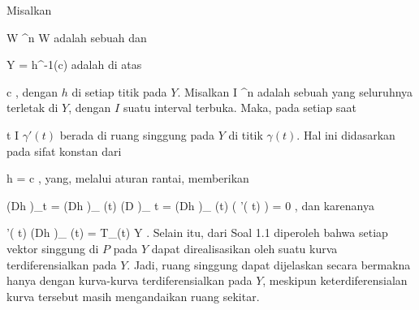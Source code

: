 {}
{

Misalkan

\mavergleichskette
{\vergleichskette
{ W
}
{ \subseteq }{ \R^n
}
{  }{
}
{    }{
}
{   }{
}
}
{}{}{}
 { W } { \R
} {}
adalah sebuah
dan

\mavergleichskette
{\vergleichskette
{ Y
}
{ = }{ h^{-1}(c)
}
{  }{
}
{    }{
}
{   }{
}
}
{}{}{}
adalah
di atas

\mavergleichskette
{\vergleichskette
{ c
}
{ \in }{ \R
}
{  }{
}
{    }{
}
{   }{
}
}
{}{}{,}
dengan $h$
di setiap titik pada $Y$. Misalkan
\maabbdisp {\gamma} { I } { \R^n
} {}
adalah sebuah
yang seluruhnya terletak di $Y$, dengan $I$ suatu interval terbuka. Maka, pada setiap saat

\mavergleichskette
{\vergleichskette
{ t
}
{ \in }{ I
}
{  }{
}
{    }{
}
{   }{
}
}
{}{}{}
$\gamma'(t)$ berada di ruang singgung pada $Y$ di titik $\gamma(t)$. Hal ini didasarkan pada sifat konstan dari

\mavergleichskette
{\vergleichskette
{ h \circ \gamma
}
{ = }{ c
}
{  }{
}
{    }{
}
{   }{
}
}
{}{}{,}
yang, melalui aturan rantai, memberikan

\mavergleichskettedisp
{\vergleichskette
{ \left(Dh \circ \gamma\right)_{t}
}
{ =} { \left(Dh  \right)_{ \gamma(t) }  \circ \left(D \gamma  \right)_{ t }
}
{ =} { \left(Dh  \right)_{ \gamma(t) } ( \gamma'( t) )
}
{ =} { 0
}
{ } {
}
}
{}{}{,}
dan karenanya

\mavergleichskette
{\vergleichskette
{ \gamma'( t)
}
{ \in }{ \ker  \left(Dh \right)_{ \gamma(t) }
}
{ = }{ T_{\gamma(t) }Y
}
{    }{
}
{   }{
}
}
{}{}{.}
Selain itu, dari
Soal 1.1
diperoleh bahwa setiap vektor singgung di $P$ pada $Y$ dapat direalisasikan oleh suatu kurva terdiferensialkan pada $Y$. Jadi, ruang singgung dapat dijelaskan secara bermakna hanya dengan kurva-kurva terdiferensialkan pada $Y$, meskipun keterdiferensialan kurva tersebut masih mengandaikan ruang sekitar.

}

